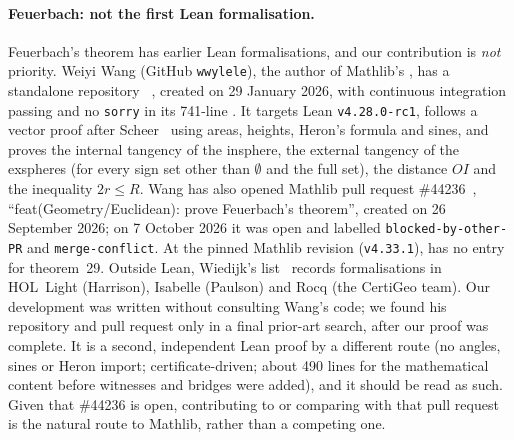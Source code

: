 \documentclass[11pt]{article}
\theoremstyle{definition}
\theoremstyle{remark}
\newcommand{\lean}[1]{\texttt{#1}}
\begin{document}
\paragraph{Feuerbach: not the first Lean formalisation.} Feuerbach's theorem has earlier Lean
formalisations, and our contribution is \emph{not} priority. Weiyi Wang (GitHub \texttt{wwylele}),
the author of Mathlib's , has a standalone repository
~\cite{WangRepo}, created on 29 January 2026, with continuous integration
passing and no \lean{sorry} in its 741-line . It targets Lean
\texttt{v4.28.0-rc1}, follows a vector proof after Scheer~\cite{Scheer} using areas, heights,
Heron's formula and sines, and proves the internal tangency of the insphere, the external tangency
of the exspheres (for every sign set other than $\emptyset$ and the full set), the distance
$OI$ and the inequality $2r\le R$. Wang has also opened Mathlib pull request
\#44236~\cite{PR44236}, ``feat(Geometry/Euclidean): prove Feuerbach's theorem'', created on
26 September 2026; on 7 October 2026 it was open and labelled \texttt{blocked-by-other-PR} and
\texttt{merge-conflict}. At the pinned Mathlib revision (\texttt{v4.33.1}), 
has no entry for theorem~29. Outside Lean, Wiedijk's list~\cite{Wiedijk100} records formalisations
in HOL~Light (Harrison), Isabelle (Paulson) and Rocq (the CertiGeo team). Our development was
written without consulting Wang's code; we found his repository and pull request only in a final
prior-art search, after our proof was complete. It is a second, independent Lean proof by a
different route (no angles, sines or Heron import; certificate-driven; about 490 lines for the
mathematical content before witnesses and bridges were added), and it should be read as such.
Given that \#44236 is open, contributing to or comparing with that pull request is the natural
route to Mathlib, rather than a competing one.
\end{document}
